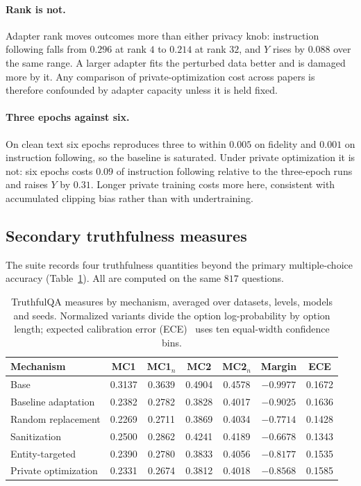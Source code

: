 \paragraph{Rank is not.}
Adapter rank moves outcomes more than either privacy knob:
instruction following falls from $0.296$ at rank $4$ to $0.214$ at rank $32$,
and $Y$ rises by $0.088$ over the same range.
A larger adapter fits the perturbed data better and is damaged more by it.
Any comparison of private-optimization cost across papers is therefore confounded by adapter capacity unless it is held fixed.

\paragraph{Three epochs against six.}
On clean text six epochs reproduces three to within $0.005$ on fidelity and $0.001$ on instruction following,
so the baseline is saturated.
Under private optimization it is not:
six epochs costs $0.09$ of instruction following relative to the three-epoch runs and raises $Y$ by $0.31$.
Longer private training costs more here,
consistent with accumulated clipping bias rather than with undertraining.

\subsection{Secondary truthfulness measures}
The suite records four truthfulness quantities beyond the primary multiple-choice accuracy (Table~\ref{tab:truthfulqa}).
All are computed on the same $817$ questions.

\begin{table}[t]
  \centering
  \caption{TruthfulQA measures by mechanism,
  averaged over datasets,
  levels,
  models and seeds.
  Normalized variants divide the option log-probability by option length;
  expected calibration error (ECE)~\citep{guo2017calibration} uses ten equal-width confidence bins.}
  \label{tab:truthfulqa}
  \small
  \setlength{\tabcolsep}{4pt}
  \begin{tabular}{lcccccc}
    \toprule
    Mechanism & MC1 & MC1$_n$ & MC2 & MC2$_n$ & Margin & ECE \\
    \midrule
    Base                 & 0.3137 & 0.3639 & 0.4904 & 0.4578 & $-0.9977$ & 0.1672 \\
    Baseline adaptation  & 0.2382 & 0.2782 & 0.3828 & 0.4017 & $-0.9025$ & 0.1636 \\
    Random replacement   & 0.2269 & 0.2711 & 0.3869 & 0.4034 & $-0.7714$ & 0.1428 \\
    Sanitization         & 0.2500 & 0.2862 & 0.4241 & 0.4189 & $-0.6678$ & 0.1343 \\
    Entity-targeted      & 0.2390 & 0.2780 & 0.3833 & 0.4056 & $-0.8177$ & 0.1535 \\
    Private optimization & 0.2331 & 0.2674 & 0.3812 & 0.4018 & $-0.8568$ & 0.1585 \\
    \bottomrule
  \end{tabular}
\end{table}

